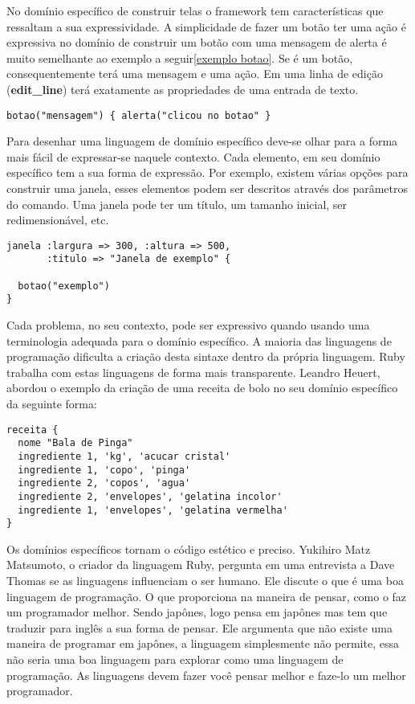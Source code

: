 \documentclass[espaco=simples,appendix=Name]{abnt}
\begin{document}
No domínio específico de construir telas o framework tem características que ressaltam a sua expressividade. A simplicidade de fazer um botão ter uma ação é expressiva no domínio de construir um botão com uma mensagem de alerta é muito semelhante ao exemplo a seguir\ref{exemplo botao}. Se é um botão, consequentemente terá uma mensagem e uma ação.  Em uma linha de edição (\textbf{edit\_line}) terá exatamente as propriedades de uma entrada de texto. 


\begin{lstlisting}[label=exemplo botao, caption=Simplicidade do botão]
botao("mensagem") { alerta("clicou no botao" } 
\end{lstlisting}


Para desenhar uma linguagem de domínio específico deve-se olhar para a forma mais fácil de expressar-se naquele contexto.
Cada elemento, em seu domínio específico tem a sua forma de expressão. Por exemplo,  existem várias opções para construir uma janela, esses elementos podem ser descritos através dos parâmetros do comando. Uma janela pode ter um título, um tamanho inicial, ser redimensionável, etc.

\begin{lstlisting}[label=exemplo janela, caption=Expressividade da construção de uma janela]
janela :largura => 300, :altura => 500, 
       :titulo => "Janela de exemplo" {

  botao("exemplo")
}
\end{lstlisting}


Cada problema, no seu contexto, pode ser expressivo quando usando uma terminologia adequada para o domínio específico. A maioria das linguagens de programação dificulta a criação desta sintaxe dentro da própria linguagem. Ruby trabalha com estas linguagens de forma mais transparente. Leandro Heuert\cite{dslLeandro}, abordou o exemplo da criação de uma receita de bolo no seu domínio específico da seguinte forma: 

\begin{lstlisting}[label=exemplo receita, caption=Expressividade de uma receita no seu domínio específico\cite{dslLeandro}]
receita {
  nome "Bala de Pinga"
  ingrediente 1, 'kg', 'acucar cristal'
  ingrediente 1, 'copo', 'pinga'
  ingrediente 2, 'copos', 'agua'
  ingrediente 2, 'envelopes', 'gelatina incolor'
  ingrediente 1, 'envelopes', 'gelatina vermelha'
}
\end{lstlisting}

Os domínios específicos tornam o código estético e preciso. Yukihiro Matz Matsumoto, o criador da linguagem Ruby, pergunta em uma entrevista a Dave Thomas se as linguagens influenciam o ser humano. Ele discute o que é uma boa linguagem de programação. O que proporciona na maneira de pensar, como o faz um programador melhor. Sendo japônes, logo pensa em japônes mas tem que traduzir para inglês a sua forma de pensar. Ele argumenta que não existe uma maneira de programar em japônes, a linguagem simplesmente não permite, essa não seria uma boa linguagem para explorar como uma linguagem de programação. As linguagens devem fazer você pensar melhor e faze-lo um melhor programador.\cite{programmingRuby}
\end{document}
